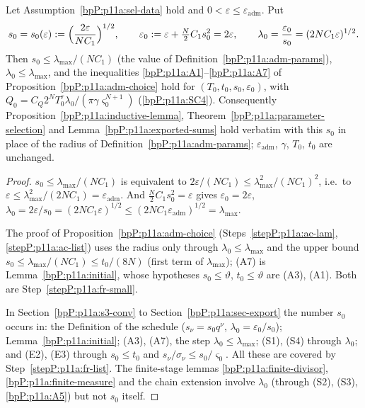 \begin{lemma}\label{bpP:p11a:free-radius}
Let Assumption~\ref{bpP:p11a:sel-data} hold and $0<\varepsilon\le\varepsilon_{\mathrm{adm}}$. Put
\[s_0=s_0(\varepsilon):=\Bigl(\frac{2\varepsilon}{NC_1}\Bigr)^{1/2},\qquad \varepsilon_0:=\varepsilon+\tfrac N2C_1s_0^2=2\varepsilon,\qquad \lambda_0=\frac{\varepsilon_0}{s_0}=(2NC_1\varepsilon)^{1/2}.\]
Then $s_0\le\lambda_{\max}/(NC_1)$ (the value of Definition~\ref{bpP:p11a:adm-params}), $\lambda_0\le\lambda_{\max}$, and the inequalities \ref{bpP:p11a:A1}--\ref{bpP:p11a:A7} of Proposition~\ref{bpP:p11a:adm-choice} hold for $(T_0,t_0,s_0,\varepsilon_0)$, with $Q_0=C_Q2^NT_0^{\tau}\lambda_0/(\pi\gamma\varsigma_0^{N+1})$ (\ref{bpP:p11a:SC4}). Consequently Proposition~\ref{bpP:p11a:inductive-lemma}, Theorem~\ref{bpP:p11a:parameter-selection} and Lemma~\ref{bpP:p11a:exported-sums} hold verbatim with this $s_0$ in place of the radius of Definition~\ref{bpP:p11a:adm-params}; $\varepsilon_{\mathrm{adm}}$, $\gamma$, $T_0$, $t_0$ are unchanged.
\end{lemma}
\begin{proof}
\label{stepP:p11a:fr-small} $s_0\le\lambda_{\max}/(NC_1)$ is equivalent to $2\varepsilon/(NC_1)\le\lambda_{\max}^2/(NC_1)^2$, i.e.\ to $\varepsilon\le\lambda_{\max}^2/(2NC_1)=\varepsilon_{\mathrm{adm}}$. And $\frac N2C_1s_0^2=\varepsilon$ gives $\varepsilon_0=2\varepsilon$, $\lambda_0=2\varepsilon/s_0=(2NC_1\varepsilon)^{1/2}\le(2NC_1\varepsilon_{\mathrm{adm}})^{1/2}=\lambda_{\max}$.

\label{stepP:p11a:fr-list} The proof of Proposition~\ref{bpP:p11a:adm-choice} (Steps~\ref{stepP:p11a:ac-lam}, \ref{stepP:p11a:ac-list}) uses the radius only through $\lambda_0\le\lambda_{\max}$ and the upper bound $s_0\le\lambda_{\max}/(NC_1)\le t_0/(8N)$ (first term of $\lambda_{\max}$); (A7) is Lemma~\ref{bpP:p11a:initial}, whose hypotheses $s_0\le\vartheta$, $t_0\le\vartheta$ are (A3), (A1). Both are Step~\ref{stepP:p11a:fr-small}.

\label{stepP:p11a:fr-other} In Section~\ref{bpP:p11a:s3-conv} to Section~\ref{bpP:p11a:sec-export} the number $s_0$ occurs in: the Definition of the schedule ($s_\nu=s_0q^\nu$, $\lambda_0=\varepsilon_0/s_0$); Lemma~\ref{bpP:p11a:initial}; (A3), (A7), the step $\lambda_0\le\lambda_{\max}$; (S1), (S4) through $\lambda_0$; and (E2), (E3) through $s_0\le t_0$ and $s_\nu/\sigma_\nu\le s_0/\varsigma_0$. All these are covered by Step~\ref{stepP:p11a:fr-list}. The finite-stage lemmas \ref{bpP:p11a:finite-divisor}, \ref{bpP:p11a:finite-measure} and the chain extension involve $\lambda_0$ (through (S2), (S3), \ref{bpP:p11a:A5}) but not $s_0$ itself.
\end{proof}
